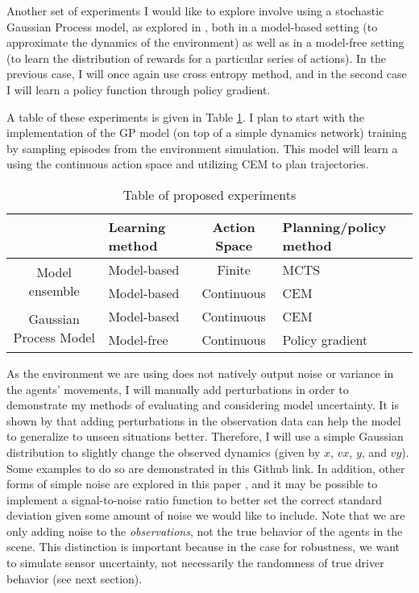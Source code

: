 \documentclass{article}
\begin{document}
Another set of experiments I would like to explore involve using a stochastic Gaussian Process model, as explored in \cite{nado2022uncertainty}, both in a model-based setting (to approximate the dynamics of the environment) as well as in a model-free setting (to learn the distribution of rewards for a particular series of actions). In the previous case, I will once again use cross entropy method, and in the second case I will learn a policy function through policy gradient.

A table of these experiments is given in Table \ref{table:1}. I plan to start with the implementation of the GP model (on top of a simple dynamics network) training by sampling episodes from the environment simulation. This model will learn a using the continuous action space and utilizing CEM to plan trajectories.
 
\begin{table}
\centering
\begin{tabular}{ c  m{2cm}  c  m{2.5cm} }
    & \textbf{Learning method} & \textbf{Action Space} & \textbf{Planning/policy method} \\
\hline \hline
\multirow{2}{*}{Model ensemble} & Model-based & Finite & MCTS \\
    & Model-based & Continuous & CEM \\
\hline 
\multirow{2}{*}{Gaussian Process Model} & Model-based & Continuous & CEM \\
    & Model-free & Continuous & Policy gradient \\
\hline
\end{tabular}
\caption{Table of proposed experiments}
\label{table:1}
\end{table}

As the environment \cite{highway-env} we are using does not natively output noise or variance in the agents' movements, I will manually add perturbations in order to demonstrate my methods of evaluating and considering model uncertainty. It is shown by \cite{robey2020modelbased} that adding perturbations in the observation data can help the model to generalize to unseen situations better. Therefore, I will use a simple Gaussian distribution to slightly change the observed dynamics (given by $x$, $vx$, $y$, and $vy$). Some examples to do so are demonstrated in this \cite{ravindran2017cartpole} Github link. In addition, other forms of simple noise are explored in this paper \cite{khraishi2023simple}, and it may be possible to implement a signal-to-noise ratio function \cite{wiki:snr} to better set the correct standard deviation given some amount of noise we would like to include. Note that we are only adding noise to the \emph{observations}, not the true behavior of the agents in the scene. This distinction is important because in the case for robustness, we want to simulate sensor uncertainty, not necessarily the randomness of true driver behavior (see next section).
\end{document}
